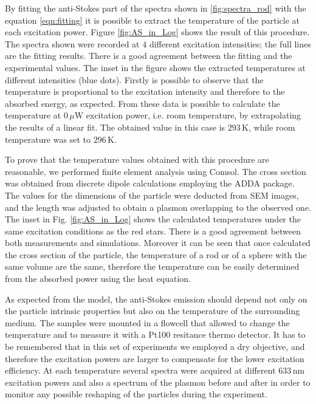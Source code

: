 \documentclass[journal=nalefd,manuscript=letter]{achemso}
\newcommand{\K}{\ensuremath{\,\textrm{K}}}
\newcommand{\nm}{\ensuremath{\,\textrm{nm}}}
\newcommand{\uW}{\ensuremath{\,\mu\textrm{W}}}
\begin{document}
By fitting the anti-Stokes part of the spectra shown in \ref{fig:spectra_rod}
with the equation \ref{eqn:fitting} it is possible to extract the temperature of
the particle at each excitation power. Figure \ref{fig:AS_in_Log} shows the
result of this procedure. The spectra shown were recorded at $4$ different
excitation intensities; the full lines are the fitting results. There is a good
agreement between the fitting and the experimental values. The inset in the
figure shows the extracted temperatures at different intensities (blue dots).
Firstly is possible to observe that the temperature is proportional to the
excitation intensity and therefore to the absorbed energy, as expected. From
these data is possible to calculate the temperature at $0\uW$ excitation
power, i.e. room temperature, by extrapolating the results of a linear fit. The
obtained value in this case is $293\K$, while room temperature was set to
$296\K$.

To prove that the temperature values obtained with this procedure are
reasonable, we performed finite element analysis using Comsol. The cross section
was obtained from discrete dipole calculations employing the ADDA
package\cite{Yurkin2011}. The values for the dimensions of the particle were
deducted from SEM images, and the length was adjusted to obtain a plasmon
overlapping to the observed one. The inset in Fig. \ref{fig:AS_in_Log} shows the
calculated temperatures under the same excitation conditions as the red stars.
There is a good agreement between both measurements and simulations. Moreover it
can be seen that once calculated the cross section of the particle, the
temperature of a rod or of a sphere with the same volume are the same, therefore
the temperature can be easily determined from the absorbed power using the heat
equation.

As expected from the model, the anti-Stokes emission should depend not only on
the particle intrinsic properties but also on the temperature of the surrounding
medium\cite{Konrad2013}. The samples were mounted in a flowcell that allowed to
change the temperature and to measure it with a Pt100 resitance thermo detector.
It has to be remembered that in this set of experiments we employed a dry
objective, and therefore the excitation powers are larger to compensate for the
lower excitation efficiency. At each temperature several spectra were acquired
at different $633\nm$ excitation powers and also a spectrum of the plasmon
before and after in order to monitor any possible reshaping of the particles
during the experiment.
\end{document}
